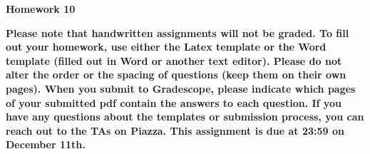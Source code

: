 \documentclass[12pt]{article}
\date{}
\begin{document}
	\begin{flushleft}
		\large \bf
		Homework 10 \\
	\end{flushleft}
{\bf
Please note that handwritten assignments will not be graded. To fill out your homework, use either the Latex template or the Word template (filled out in Word or another text editor). Please do not alter the order or the spacing of questions (keep them on their own pages). When you submit to Gradescope, please indicate which pages of your submitted pdf contain the answers to each question. If you have any questions about the templates or submission process, you can reach out to the TAs on Piazza. This assignment is due at 23:59 on December 11th.
}
\end{document}
